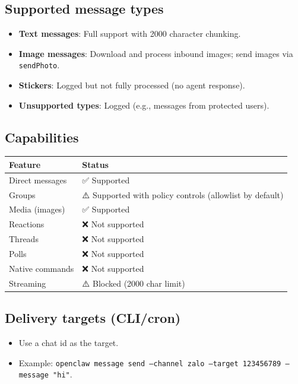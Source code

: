 \subsection{Supported message types}


\begin{itemize}
  \item \textbf{Text messages}: Full support with 2000 character chunking.
  \item \textbf{Image messages}: Download and process inbound images; send images via \texttt{sendPhoto}.
  \item \textbf{Stickers}: Logged but not fully processed (no agent response).
  \item \textbf{Unsupported types}: Logged (e.g., messages from protected users).
\end{itemize}


\subsection{Capabilities}



\begin{table}[h]
\centering
\small
\begin{tabular}{|l|l|}
\hline
Feature & Status \\
\hline
Direct messages & ✅ Supported \\
\hline
Groups & ⚠️ Supported with policy controls (allowlist by default) \\
\hline
Media (images) & ✅ Supported \\
\hline
Reactions & ❌ Not supported \\
\hline
Threads & ❌ Not supported \\
\hline
Polls & ❌ Not supported \\
\hline
Native commands & ❌ Not supported \\
\hline
Streaming & ⚠️ Blocked (2000 char limit) \\
\hline
\end{tabular}
\end{table}



\subsection{Delivery targets (CLI/cron)}


\begin{itemize}
  \item Use a chat id as the target.
  \item Example: \texttt{openclaw message send --channel zalo --target 123456789 --message "hi"}.
\end{itemize}


